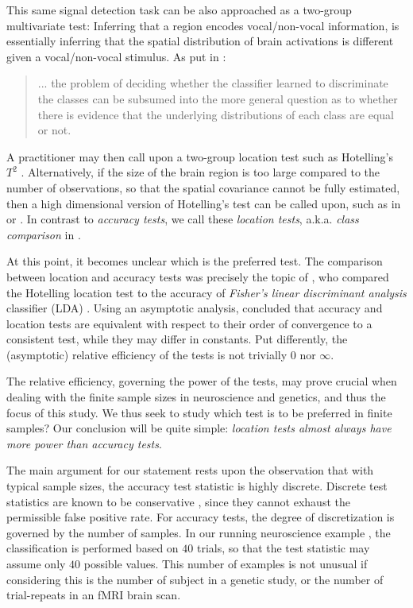 \documentclass[12pt,a4paper]{article}
\begin{document}
This same signal detection task can be also approached as a two-group multivariate test:
Inferring that a region encodes vocal/non-vocal information, is essentially inferring that the spatial distribution of brain activations is different given a vocal/non-vocal stimulus. 
As put in \cite{pereira_machine_2009}: 
\begin{quote}
... the problem of deciding whether the classifier learned to discriminate the classes can be subsumed into the more general question as to whether there is evidence that the underlying distributions of each class are equal or not.
\end{quote}
A practitioner may then call upon a two-group location test such as Hotelling's $T^2$ \citep{fujikoshi_multivariate_2011}.
Alternatively, if the size of the brain region is too large compared to the number of observations, so that the spatial covariance cannot be fully estimated, then a high dimensional version of Hotelling's test can be called upon, such as in \cite{srivastava_testing_2013} or \cite{schafer_shrinkage_2005}.
In contrast to \emph{accuracy tests}, we call these \emph{location tests}, a.k.a. \emph{class comparison} in \cite{simon_pitfalls_2003}.

At this point, it becomes unclear which is the preferred test. 
The comparison between location and accuracy tests was precisely the topic of \cite{ramdas_classification_2016}, who compared the Hotelling location test to the accuracy of \emph{Fisher's linear discriminant analysis} classifier (LDA) \citep{hastie_elements_2003-1}. 
Using an asymptotic analysis, \cite{ramdas_classification_2016} concluded that accuracy and location tests are equivalent with respect to their order of convergence to a consistent test, while they may differ in constants. 
Put differently, the (asymptotic) relative efficiency of the tests is not trivially $0$ nor $\infty$.

The relative efficiency, governing the power of the tests, may prove crucial when dealing with the finite sample sizes in neuroscience and genetics, and thus the focus of this study. 
We thus seek to study which test is to be preferred in finite samples? 
Our conclusion will be quite simple: {\em location tests almost always have more power than accuracy tests}.

The main argument for our statement rests upon the observation that with typical sample sizes, the accuracy test statistic is highly discrete. 
Discrete test statistics are known to be conservative \citep{hemerik_exact_2014-1}, since they cannot exhaust the permissible false positive rate. 
For accuracy tests, the degree of discretization is governed by the number of samples. 
In our running neuroscience example \citep{gilron_quantifying_2016}, the classification is performed based on $40$ trials, so that the test statistic may assume only $40$ possible values. 
This number of examples is not unusual if considering this is the number of subject in a genetic study, or the number of trial-repeats in an fMRI brain scan. 
\end{document}
